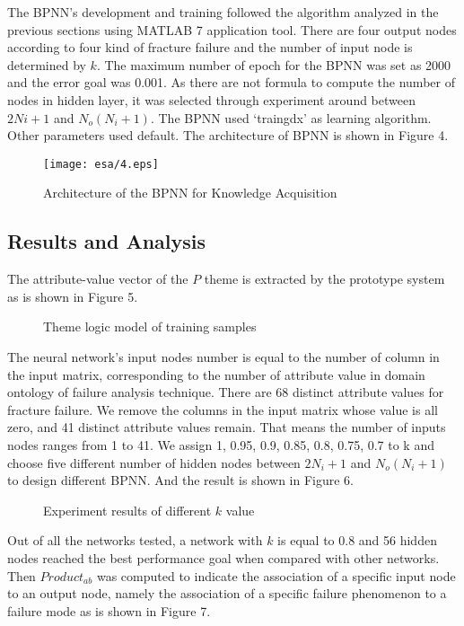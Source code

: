\documentclass{elsarticle}
\begin{document}
The BPNN’s development and training followed the algorithm analyzed in
the previous sections using MATLAB 7 application tool. There
are four output nodes according to four kind of fracture failure and
the number of input node is determined by $k$. The maximum number of
epoch for the BPNN was set as 2000 and the error goal was 0.001. As
there are not formula to compute the number of nodes in hidden layer,
it was selected through experiment around between $2Ni+1$ and $N_o(N_i
+1)$. The BPNN used ‘traingdx’ as learning algorithm. Other parameters
used default. The architecture of BPNN is shown in Figure 4.
\begin{figure}[htb]
  \centering
  \texttt{[image: esa/4.eps]}
  \caption{Architecture of the BPNN for Knowledge Acquisition
  }
\label{fig:4}
\end{figure}

\subsection{Results and Analysis
}
\label{sec:results-analysis-}

The attribute-value vector of the $P$ theme is extracted by the prototype system as is shown in Figure 5.

 \begin{figure}[htb]
  \centering
  \caption{Theme logic model of training samples}
\label{fig:5}
\end{figure}

The neural network’s input nodes number is equal to the number of column in the input matrix, corresponding to the number of attribute value in domain ontology of failure analysis technique. There are 68 distinct attribute values for fracture failure. We remove the columns in the input matrix whose value is all zero, and 41 distinct attribute values remain. That means the number of inputs nodes ranges from 1 to 41. We assign 1, 0.95, 0.9, 0.85, 0.8, 0.75, 0.7 to k and choose five different number of hidden nodes between $2N_i+1$ and $N_o(N_i +1)$ to design different BPNN. And the result is shown in Figure 6.

 \begin{figure}[htb]
  \centering
  \caption{Experiment results of different $k$ value}
\label{fig:6}
\end{figure}
 
Out of all the networks tested, a network with $k$ is equal to 0.8 and 56
hidden nodes reached the best performance goal when compared with
other networks. Then $Product_{ab}$  was computed to indicate the
association of a specific input node to an output node, namely the
association of a specific failure phenomenon to a failure mode as is
shown in Figure 7. 
\end{document}
